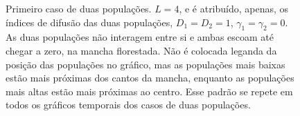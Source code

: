 \documentclass{article}
\begin{document}
	\begin{figure}[h]
		\centering
		\qquad
		\caption{Primeiro caso de duas populações. $L=4$, e é atribuído, apenas, os índices de difusão das duas populações, $D_1 = D_2 = 1$, $\gamma_1 = \gamma_2 = 0$. As duas populações não interagem entre si e ambas escoam até chegar a zero, na mancha florestada. Não é colocada leganda da posição das populações no gráfico, mas as populações mais baixas estão mais próximas dos cantos da mancha, enquanto as populações mais altas estão mais próximas ao centro. Esse padrão se repete em todos os gráficos temporais dos casos de duas populações.}
		\label{fig:Two-P-00-Diffusion-Time}
	\end{figure}	
\end{document}
